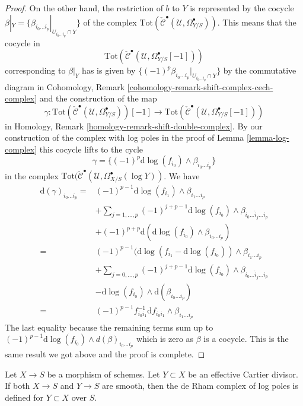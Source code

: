 \begin{proof}
\medskip\noindent
On the other hand, the restriction of $b$ to $Y$ is represented by the
cocycle
$\beta|_Y = \{\beta_{i_0 \ldots i_p}|_{U_{i_0 \ldots i_p} \cap Y}\}$
of the complex
$\text{Tot}(\check{\mathcal{C}}^\bullet(\mathcal{U}, \Omega_{Y/S}^\bullet))$.
This means that the cocycle in
$$
\text{Tot}(\check{\mathcal{C}}^\bullet(\mathcal{U}, \Omega_{Y/S}^\bullet[-1]))
$$
corresponding to $\beta|_Y$ has is given by
$\{(-1)^p\beta_{i_0 \ldots i_p}|_{U_{i_0 \ldots i_p} \cap Y}\}$
by the commutative diagram in
Cohomology, Remark \ref{cohomology-remark-shift-complex-cech-complex}
and the construction of the map
$$
\gamma :
\text{Tot}(\check{\mathcal{C}}^\bullet(\mathcal{U}, \Omega_{Y/S}^\bullet))[-1]
\longrightarrow
\text{Tot}(\check{\mathcal{C}}^\bullet(\mathcal{U}, \Omega_{Y/S}^\bullet[-1]))
$$
in Homology, Remark \ref{homology-remark-shift-double-complex}.
By our construction of the complex with log poles in the proof of
Lemma \ref{lemma-log-complex} this cocycle lifts to the cycle
$$
\gamma = \{(-1)^p\text{d}\log(f_{i_0}) \wedge \beta_{i_0 \ldots i_p}\}
$$
in the complex $\text{Tot}(\check{\mathcal{C}}^\bullet(\mathcal{U},
\Omega_{X/S}^\bullet(\log Y))$. We have
\begin{align*}
\text{d}(\gamma)_{i_0 \ldots i_p} = &
(-1)^{p - 1} \text{d}\log(f_{i_1}) \wedge \beta_{i_1 \ldots i_p} \\
& +
\sum\nolimits_{j = 1, \ldots, p}
(-1)^{j + p - 1}
\text{d}\log(f_{i_0}) \wedge \beta_{i_0 \ldots \hat i_j \ldots i_p} \\
& +
(-1)^{p + p} \text{d}(\text{d}\log(f_{i_0}) \wedge \beta_{i_0 \ldots i_p}) \\
= &
(-1)^{p - 1} (\text{d}\log(f_{i_1} - \text{d}\log(f_{i_0}))
\wedge \beta_{i_1 \ldots i_p} \\
& +
\sum\nolimits_{j = 0, \ldots, p}
(-1)^{j + p - 1}
\text{d}\log(f_{i_0}) \wedge \beta_{i_0 \ldots \hat i_j \ldots i_p} \\
& -
\text{d}\log(f_{i_0}) \wedge \text{d}(\beta_{i_0 \ldots i_p}) \\
= &
(-1)^{p - 1} f_{i_0i_1}^{-1} \text{d}f_{i_0i_1} \wedge \beta_{i_1 \ldots i_p}
\end{align*}
The last equality because the remaining terms sum up to
$(-1)^{p - 1}\text{d}\log(f_{i_0}) \wedge d(\beta)_{i_0 \ldots i_p}$ which
is zero as $\beta$ is a cocycle. This is the same result we got above
and the proof is complete.
\end{proof}

\begin{lemma}
\label{lemma-check-log-smooth}
Let $X \to S$ be a morphism of schemes. Let $Y \subset X$ be an effective
Cartier divisor. If both $X \to S$ and $Y \to S$ are smooth, then
the de Rham complex of log poles is defined for $Y \subset X$ over $S$.
\end{lemma}

